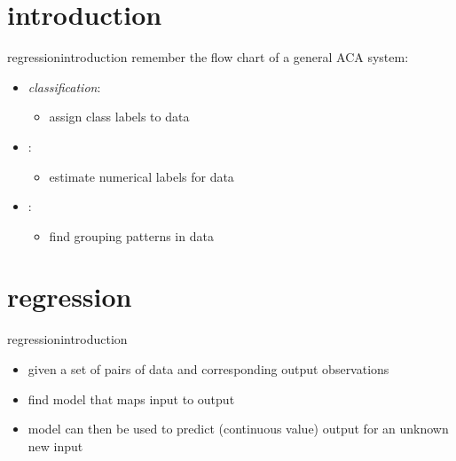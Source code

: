     \section[intro]{introduction}
        \begin{frame}{regression}{introduction}
            remember the flow chart of a general ACA system:
            \vspace{-3mm}
            \begin{figure}
                
            \end{figure}
            \begin{itemize}
                \item<2->   \textit{classification}: 
                    \begin{itemize}
                        \item   assign class labels to data
                    \end{itemize}
                \item<2->   :
                    \begin{itemize}
                        \item	estimate numerical labels for data
                    \end{itemize}
                \item<2->   :
                    \begin{itemize}
                        \item	find grouping patterns in data
                    \end{itemize}
            \end{itemize}
        \end{frame}
        
    \section{regression}
        \begin{frame}{regression}{introduction}
             \vspace{-3mm}
             \begin{itemize}
                 \item  given a set of pairs of data and corresponding output observations
                \item   find model that maps input to output
                \bigskip
                \item<2-> model can then be used to predict (continuous value) output for an unknown new input
             \end{itemize}
        \end{frame}
        
